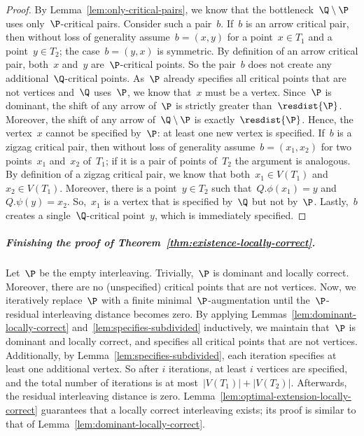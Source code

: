\begin{proof}
	By Lemma~\ref{lem:only-critical-pairs}, we know that the bottleneck~$\Q \setminus \P$ uses only~$\P$-critical pairs.
	Consider such a pair~$b$.
	If~$b$ is an arrow critical pair, then without loss of generality assume~$b=(x, y)$ for a point~$x \in T_1$ and a point~$y \in T_2$; the case~$b=(y, x)$ is symmetric. 
    By definition of an arrow critical pair, both~$x$ and~$y$ are~$\P$-critical points.
    So the pair~$b$ does not create any additional~$\Q$-critical points.
    As~$\P$ already specifies all critical points that are not vertices and~$\Q$ uses~$\P$, we know that~$x$ must be a vertex.
    Since~$\P$ is dominant, the shift of any arrow of~$\P$ is strictly greater than~$\resdist{\P}$.
    Moreover, the shift of any arrow of~$\Q \setminus \P$ is exactly~$\resdist{\P}$.
    Hence, the vertex~$x$ cannot be specified by~$\P$: at least one new vertex is specified.
%
	If~$b$ is a zigzag critical pair, then without loss of generality assume~$b = (x_1, x_2)$ for two points~$x_1$ and~$x_2$ of~$T_1$; if it is a pair of points of~$T_2$ the argument is analogous.
	By definition of a zigzag critical pair, we know that both~$x_1 \in V(T_1)$ and~$x_2 \in V(T_1)$.
    Moreover, there is a point~$y \in T_2$ such that~$Q.\phi(x_1) = y$ and~$Q.\psi(y) =  x_2$.
    So,~$x_1$ is a vertex that is specified by~$\Q$ but not by~$\P$.
    Lastly,~$b$ creates a single~$\Q$-critical point~$y$, which is immediately specified.
\end{proof}
%
\subparagraph{Finishing the proof of Theorem~\ref{thm:existence-locally-correct}.}
Let~$\P$ be the empty interleaving.
Trivially,~$\P$ is dominant and locally correct.
Moreover, there are no (unspecified) critical points that are not vertices.
Now, we iteratively replace~$\P$ with a finite minimal~$\P$-augmentation until the~$\P$-residual interleaving distance becomes zero.
By applying Lemmas~\ref{lem:dominant-locally-correct} and~\ref{lem:specifies-subdivided} inductively, we maintain that~$\P$ is dominant and locally correct, and specifies all critical points that are not vertices.
Additionally, by Lemma~\ref{lem:specifies-subdivided}, each iteration specifies at least one additional vertex.
So after $i$ iterations, at least $i$ vertices are specified, and the total number of iterations is at most~$|V(T_1)| + |V(T_2)|$.
Afterwards, the residual interleaving distance is zero.
Lemma~\ref{lem:optimal-extension-locally-correct} guarantees that a locally correct interleaving exists; its proof is similar to that of Lemma~\ref{lem:dominant-locally-correct}.
